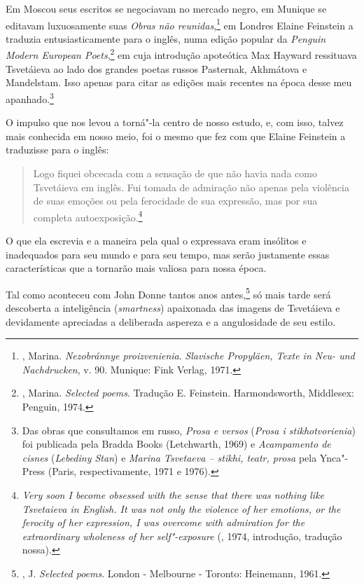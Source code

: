 Em Moscou seus escritos se negociavam no mercado negro, em Munique
se editavam luxuosamente suas \emph{Obras não
reunidas},\footnote{, Marina. \emph{Nezobránnye
proizvenienia}. \emph{Slavische Propyläen, Texte in Neu- und
Nachdrucken}, v. 90. Munique: Fink Verlag, 1971.} em Londres
Elaine Feinstein a traduzia entusiasticamente para o inglês,
numa edição popular da \emph{Penguin Modern European
Poets},\footnote{, Marina. \emph{Selected
poems}. Tradução E. Feinstein. Harmondsworth, Middlesex:
Penguin, 1974.} em cuja introdução apoteótica Max Hayward
ressituava Tsvetáieva ao lado dos grandes poetas russos
Pasternak, Akhmátova e Mandelstam. Isso apenas para citar
as edições mais recentes na época desse meu apanhado.\footnote{Das
obras que consultamos em russo, \emph{Prosa e versos} (\emph{Prosa
i stikhotvorienia}) foi publicada pela Bradda Books (Letchwarth,
1969) e \emph{Acampamento de cisnes} (\emph{Lebediny Stan}) e
\emph{Marina Tsvetaeva -- stikhi, teatr, prosa} pela Ynca"-Press
(Paris, respectivamente, 1971 e 1976).}

O impulso que nos levou a torná"-la centro de nosso estudo, e,
com isso, talvez mais conhecida em nosso meio, foi o mesmo que
fez com que Elaine Feinstein a traduzisse para o inglês:

\begin{quotation}
Logo fiquei obcecada com a sensação de que não havia nada como
Tsvetáieva em inglês. Fui tomada de admiração não apenas pela
violência de suas emoções ou pela ferocidade de sua expressão,
mas por sua completa autoexposição.\footnote{\emph{Very soon I
become obsessed with the sense that there was nothing like
Tsvetaieva in English. It was not only the violence of her
emotions, or the ferocity of her expression, I was overcome
with admiration for the extraordinary wholeness of her
self"-exposure} (, 1974, introdução,
tradução nossa).}
\end{quotation}

O que ela escrevia e a maneira pela qual o expressava eram
insólitos e inadequados para seu mundo e para seu tempo, mas
serão justamente essas características que a tornarão mais
valiosa para nossa época.

Tal como aconteceu com John Donne tantos anos
antes,\footnote{, J. \emph{Selected poems}.
London - Melbourne - Toronto: Heinemann, 1961.} só mais tarde
será descoberta a inteligência (\emph{smartness}) apaixonada
das imagens de Tsvetáieva e devidamente apreciadas a
deliberada aspereza e a angulosidade de seu estilo.

